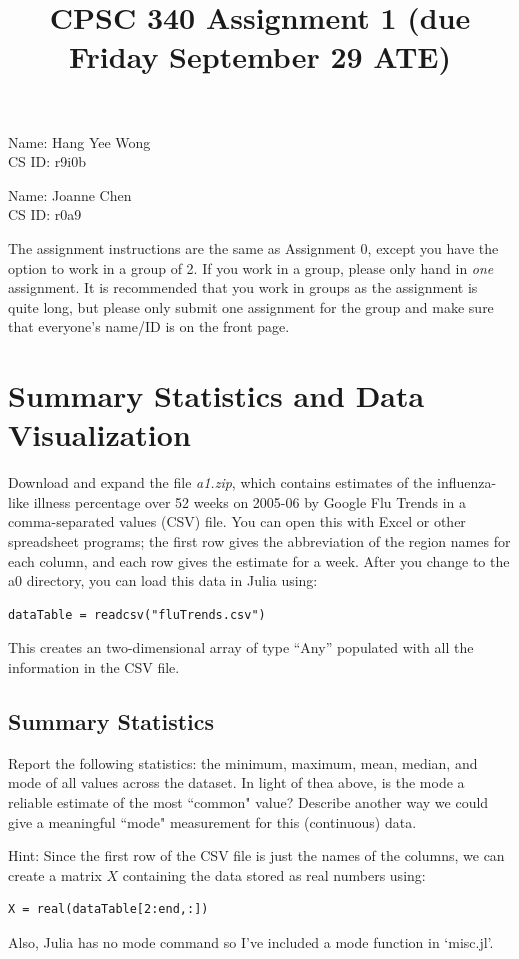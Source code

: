 \documentclass{article}
\def\blu#1{{\color{blu}#1}}
\begin{document}
\title{CPSC 340 Assignment 1 (due Friday September 29 ATE)}
\author{}
\date{}
\maketitle
\vspace{-4em}


Name: Hang Yee Wong\\
CS ID: r9i0b 

Name: Joanne Chen\\
CS ID: r0a9

The assignment instructions are the same as Assignment 0, except you have the option to work in a group of 2. If you work in a group, please only hand in \emph{one} assignment. It is recommended that you work in groups as the assignment is quite long, but please only submit one assignment for the group and make sure that everyone's name/ID is on the front page.


\section{Summary Statistics and Data Visualization}

Download and expand the file \emph{a1.zip}, which contains estimates of the influenza-like illness percentage over 52 weeks on 2005-06 by Google Flu Trends in a comma-separated values (CSV) file. You can open this with Excel or other spreadsheet programs; the first row gives the abbreviation of the region names for each column, and each row gives the estimate for a week.
After you change to the a0 directory, you can load this data in Julia using:
\begin{verbatim}
dataTable = readcsv("fluTrends.csv")
\end{verbatim}
This creates an two-dimensional array of type ``Any''  populated with all the information in the CSV file.

\subsection{Summary Statistics}

\blu{Report the following statistics}: the minimum, maximum, mean, median, and mode of all values across the dataset. In light of thea above, \blu{is the mode a reliable estimate of the most ``common" value? Describe another way we could give a meaningful ``mode" measurement for this (continuous) data.}

Hint: Since the first row of the CSV file is just the names of the columns, we can create a matrix $X$ containing the data stored as real numbers using:
\begin{verbatim}
X = real(dataTable[2:end,:])
\end{verbatim}
Also, Julia has no mode command so I've included a mode function in `misc.jl'.
\end{document}
